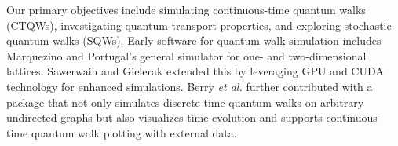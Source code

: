 \documentclass[../../main.tex]{subfiles}
\begin{document}

Our primary objectives include simulating continuous-time quantum walks
(CTQWs), investigating quantum transport properties, and exploring stochastic
quantum walks (SQWs). Early software for quantum walk simulation includes
Marquezino and Portugal's \cite{marquezino2008} general simulator for one- and
two-dimensional lattices. Sawerwain and Gielerak \cite{sawerwain2010} extended
this by leveraging GPU and CUDA technology for enhanced simulations. Berry
\textit{et al.} \cite{berry2011} further contributed with a package that not
only simulates discrete-time quantum walks on arbitrary undirected graphs but
also visualizes time-evolution and supports continuous-time quantum walk
plotting with external data. 
\end{document}
